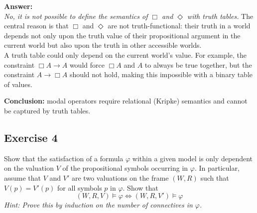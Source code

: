 \documentclass[11pt]{article}
\begin{document}
    \textbf{Answer:} \\
    \emph{No, it is not possible to define the semantics of $\Box$ and $\Diamond$ with truth tables.} The central reason is that $\Box$ and $\Diamond$ are not truth-functional: their truth in a world depends not only upon the truth value of their propositional argument in the current world but also upon the truth in other accessible worlds.\\

    A truth table could only depend on the current world's value.
    For example, the constraint $\Box A \rightarrow A$ would force $\Box A$ and $A$ to always be true together, but the constraint $A \rightarrow \Box A$ should not hold, making this impossible with a binary table of values.

    \begin{center}
    \end{center}

    \textbf{Conclusion:} modal operators require relational (Kripke) semantics and cannot be captured by truth tables.


    \subsection{Exercise 4}

    Show that the satisfaction of a formula $\varphi$ within a given model is only dependent on the valuation $V$ of the propositional symbols occurring in $\varphi$. In particular, assume that $V$ and $V'$ are two valuations on the frame $(W, R)$ such that $V(p) = V'(p)$ for all symbols $p$ in $\varphi$. Show that
    \[
    (W,R,V) \models \varphi \iff (W,R,V') \models \varphi
    \]
    \emph{Hint: Prove this by induction on the number of connectives in $\varphi$.}
\end{document}
